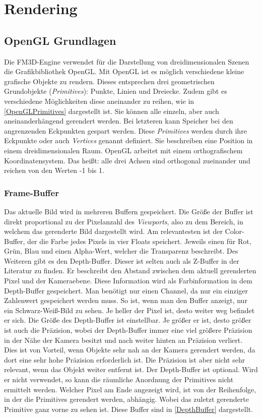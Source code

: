 \section[Rendering]{Rendering\cite{GLReference, OglDev, ThinMatrix, SparkyEngine, GLTut}}
\label{rendering}
\subsection{OpenGL Grundlagen}

Die FM3D-Engine verwendet für die Darstellung von dreidimensionalen Szenen die Grafikbibliothek OpenGL. Mit OpenGL ist es möglich verschiedene kleine grafische Objekte zu rendern. Dieses entsprechen drei geometrischen Grundobjekte (\textit{Primitives}): 
Punkte, Linien und Dreiecke. Zudem gibt es verschiedene Möglichkeiten diese aneinander zu reihen, wie in \cref{OpenGLPrimitives} dargestellt ist. Sie können alle einzeln, aber auch aneinanderhängend gerendert werden. Bei letzteren kann Speicher bei den angrenzenden Eckpunkten gespart werden. Diese \textit{Primitives} werden durch ihre Eckpunkte oder auch \textit{Vertices} genannt definiert. 
Sie beschreiben eine Position in einem dreidimensionalen Raum. OpenGL arbeitet mit einem orthografischem Koordinatensystem. Das heißt: alle drei Achsen sind orthogonal zueinander und reichen von den Werten -1 bis 1.

\subsubsection{Frame-Buffer}
Das aktuelle Bild wird in mehreren Buffern gespeichert. Die Größe der Buffer ist direkt proportional zu der Pixelanzahl des \textit{Viewports}, also zu dem Bereich, in welchem das gerenderte Bild dargestellt wird. 
Am relevantesten ist der Color-Buffer, der die Farbe jedes Pixels in vier Floats speichert. Jeweils einen für Rot, Grün, Blau und einen Alpha-Wert, welcher die Transparenz beschreibt. Des Weiteren gibt es den Depth-Buffer. Dieser ist selten auch als Z-Buffer in der Literatur zu finden. Er beschreibt den Abstand zwischen dem aktuell gerenderten Pixel und der Kameraebene. Diese Information wird als Farbinformation in dem Depth-Buffer gespeichert. 
Man benötigt nur einen Channel, da nur ein einziger Zahlenwert gespeichert werden muss. So ist, wenn man den Buffer anzeigt, nur ein Schwarz-Weiß-Bild zu sehen. 
Je heller der Pixel ist, desto weiter weg befindet er sich. Die Größe des Depth-Buffer ist einstellbar. Je größer er ist, desto größer ist auch die Präzision, wobei der Depth-Buffer immer eine viel größere Präzision in der Nähe der Kamera besitzt und nach weiter hinten an Präzision verliert. Dies ist von Vorteil, wenn Objekte sehr nah an der Kamera gerendert werden, da dort eine sehr hohe Präzision erforderlich ist. 
Die Präzision ist aber nicht sehr relevant, wenn das Objekt weiter entfernt ist. Der Depth-Buffer ist optional. Wird er nicht verwendet, so kann die räumliche Anordnung der Primitives nicht ermittelt werden. Welcher Pixel am Ende angezeigt wird, ist von der Reihenfolge, in der die Primitives gerendert werden, abhängig. Wobei das zuletzt gerenderte Primitive ganz vorne zu sehen ist. Diese Buffer sind in \cref{DepthBuffer} dargestellt. 

